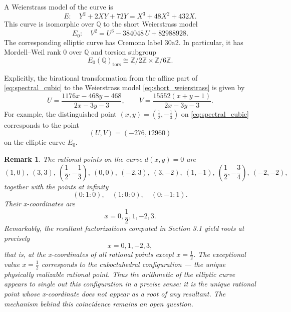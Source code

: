 \documentclass[12pt]{article}
\newtheorem{rmk}{Remark}
\begin{document}
A Weierstrass model of the curve is
\[
E:\quad Y^2 + 2XY + 72Y = X^3 + 48X^2 + 432X .
\]
This curve is isomorphic over $\mathbb{Q}$ to the short Weierstrass model
\begin{equation}
\label{eq:short_weierstrass}
E_0:\quad V^2 = U^3 - 384048\,U + 82988928 .
\end{equation}
The corresponding elliptic curve has Cremona label $30\mathrm{a}2$.
In particular, it has Mordell--Weil rank $0$ over $\mathbb{Q}$ and torsion subgroup
\[
E_0(\mathbb{Q})_{\mathrm{tors}} \cong \mathbb{Z}/2\mathbb{Z} \times \mathbb{Z}/6\mathbb{Z}.
\]

Explicitly, the birational transformation from the affine part of
\eqref{eq:spectral_cubic} to the Weierstrass model \eqref{eq:short_weierstrass} is given by
\[
U = \frac{1176x - 468y - 468}{2x - 3y - 3}, \qquad
V = \frac{15552(x + y - 1)}{2x - 3y - 3}.
\]
For example, the distinguished point $(x,y)=(\tfrac12,-\tfrac13)$ on
\eqref{eq:spectral_cubic} corresponds to the point
\[
(U,V)=(-276,12960)
\]
on the elliptic curve $E_0$.

\begin{rmk}
 The rational points on the curve $d(x,y)=0$
 are 
 $$(1,0),\ (3,3),\ \left(\frac12,-\frac13\right),\ (0,0),\ (-2,3),\ (3,-2),\ (1,-1),\ \left(\frac12,-\frac34\right),\ (-2,-2),$$ 
 together with the points at infinity
 $$(0:1:0), \quad (1:0:0), \quad (0:-1:1).$$
 Their x-coordinates are
 $$x = 0, \frac{1}{2}, 1, -2, 3.$$
 Remarkably, the resultant factorizations computed in Section 3.1 yield roots at precisely
 $$x = 0, 1, -2, 3,$$
 that is, at the x-coordinates of all rational points except 
 $x=\frac{1}{2}$. The exceptional value $x=\frac{1}{2}$
 corresponds to the cuboctahedral configuration — the unique physically realizable rational point.
 Thus the arithmetic of the elliptic curve appears to single out this configuration in a precise sense: it is the unique rational point whose x-coordinate does not appear as a root of any resultant. The mechanism behind this coincidence remains an open question.
\end{rmk}
\end{document}
